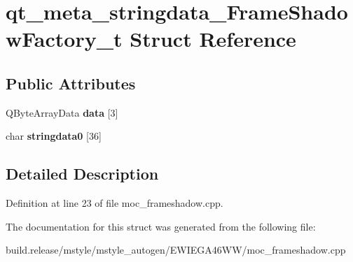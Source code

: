 \hypertarget{structqt__meta__stringdata___frame_shadow_factory__t}{}\section{qt\+\_\+meta\+\_\+stringdata\+\_\+\+Frame\+Shadow\+Factory\+\_\+t Struct Reference}
\label{structqt__meta__stringdata___frame_shadow_factory__t}
\subsection*{Public Attributes}
\begin{DoxyCompactItemize}
\item 
\mbox{\label{structqt__meta__stringdata___frame_shadow_factory__t_afbf463dbf42af551b880248fb30f9218}} 
Q\+Byte\+Array\+Data {\bfseries data} \mbox{[}3\mbox{]}
\item 
\mbox{\label{structqt__meta__stringdata___frame_shadow_factory__t_ac3b4a6830736433465901127e2320da9}} 
char {\bfseries stringdata0} \mbox{[}36\mbox{]}
\end{DoxyCompactItemize}


\subsection{Detailed Description}


Definition at line 23 of file moc\+\_\+frameshadow.\+cpp.



The documentation for this struct was generated from the following file\+:\begin{DoxyCompactItemize}
\item 
build.\+release/mstyle/mstyle\+\_\+autogen/\+E\+W\+I\+E\+G\+A46\+W\+W/moc\+\_\+frameshadow.\+cpp\end{DoxyCompactItemize}
